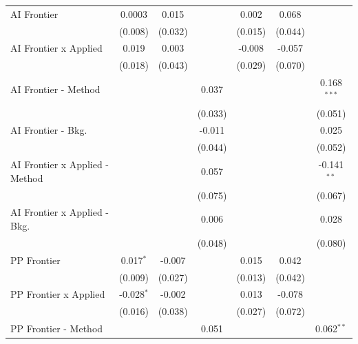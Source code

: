 \begin{tabular}{lcccccc}
   AI Frontier                    & 0.0003       & 0.015        &               & 0.002   & 0.068         &   \\   
                                  & (0.008)      & (0.032)      &               & (0.015) & (0.044)       &   \\   
   AI Frontier x Applied          & 0.019        & 0.003        &               & -0.008  & -0.057        &   \\   
                                  & (0.018)      & (0.043)      &               & (0.029) & (0.070)       &   \\   
   AI Frontier - Method           &              &              & 0.037         &         &               & 0.168$^{***}$\\   
                                  &              &              & (0.033)       &         &               & (0.051)\\   
   AI Frontier - Bkg.             &              &              & -0.011        &         &               & 0.025\\   
                                  &              &              & (0.044)       &         &               & (0.052)\\   
   AI Frontier x Applied - Method &              &              & 0.057         &         &               & -0.141$^{**}$\\   
                                  &              &              & (0.075)       &         &               & (0.067)\\   
   AI Frontier x Applied - Bkg.   &              &              & 0.006         &         &               & 0.028\\   
                                  &              &              & (0.048)       &         &               & (0.080)\\   
   PP Frontier                    & 0.017$^{*}$  & -0.007       &               & 0.015   & 0.042         &   \\   
                                  & (0.009)      & (0.027)      &               & (0.013) & (0.042)       &   \\   
   PP Frontier x Applied          & -0.028$^{*}$ & -0.002       &               & 0.013   & -0.078        &   \\   
                                  & (0.016)      & (0.038)      &               & (0.027) & (0.072)       &   \\   
   PP Frontier - Method           &              &              & 0.051         &         &               & 0.062$^{**}$\\   

\end{tabular}
